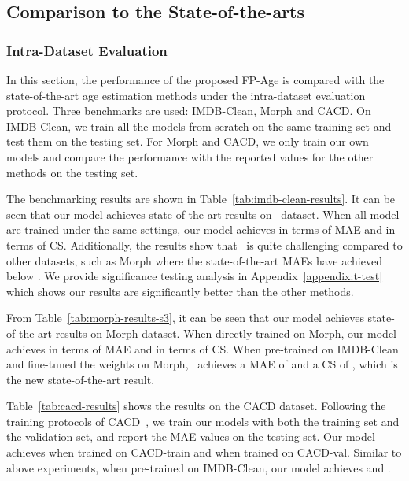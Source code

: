 \subsection{Comparison to the State-of-the-arts} \label{sec:compare-sotas}
\subsubsection{Intra-Dataset Evaluation}
In this section, the performance of the proposed FP-Age is compared with the state-of-the-art age estimation methods under the intra-dataset evaluation protocol. Three benchmarks are used: IMDB-Clean, Morph and CACD. On IMDB-Clean, we train all the models from scratch on the same training set and test them on the testing set. For Morph and CACD, we only train our own models and compare the performance with the reported values for the other methods on the testing set.


The benchmarking results are shown in Table~\ref{tab:imdb-clean-results}. It can be seen that our model achieves state-of-the-art results on \imdbc~dataset. When all model are trained under the same settings, our model achieves  in terms of MAE and  in terms of CS. Additionally, the results show that \imdbc~is quite challenging compared to other datasets, such as Morph where the state-of-the-art MAEs have achieved below . We provide significance testing analysis in Appendix~\ref{appendix:t-test} which shows our results are significantly better than the other methods.

From Table~\ref{tab:morph-results-s3}, it can be seen that our model achieves state-of-the-art results on Morph dataset. When directly trained on Morph, our model achieves  in terms of MAE and  in terms of CS. When pre-trained on IMDB-Clean and fine-tuned the weights on Morph, \fpage~achieves a MAE of  and a  CS of , which is the new state-of-the-art result.

Table~\ref{tab:cacd-results} shows the results on the CACD dataset. Following the training protocols of CACD~\cite{shenDeepRegressionForests2018}, we train our models with both the training set and the validation set, and report the MAE values on the testing set. Our model achieves  when trained on CACD-train and  when trained on CACD-val. Similar to above experiments, when pre-trained on IMDB-Clean, our model achieves  and  .  
